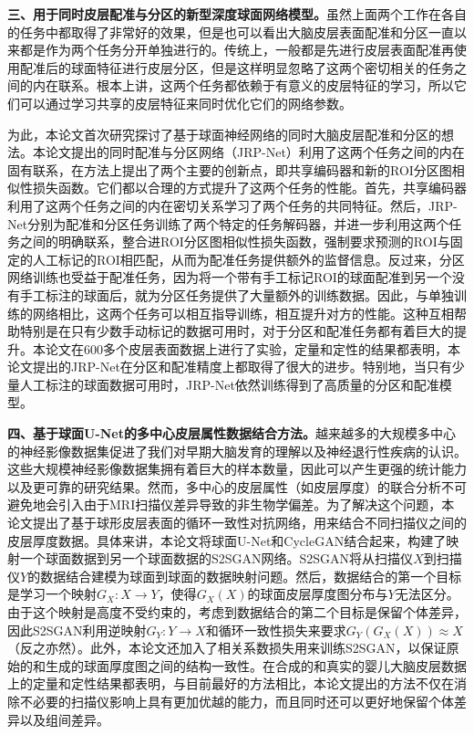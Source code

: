 \textbf{三、用于同时皮层配准与分区的新型深度球面网络模型。}虽然上面两个工作在各自的任务中都取得了非常好的效果，但是也可以看出大脑皮层表面配准和分区一直以来都是作为两个任务分开单独进行的。传统上，一般都是先进行皮层表面配准再使用配准后的球面特征进行皮层分区，但是这样明显忽略了这两个密切相关的任务之间的内在联系。根本上讲，这两个任务都依赖于有意义的皮层特征的学习，所以它们可以通过学习共享的皮层特征来同时优化它们的网络参数。

为此，本论文首次研究探讨了基于球面神经网络的同时大脑皮层配准和分区的想法。本论文提出的同时配准与分区网络（JRP-Net）利用了这两个任务之间的内在固有联系，在方法上提出了两个主要的创新点，即共享编码器和新的ROI分区图相似性损失函数。它们都以合理的方式提升了这两个任务的性能。首先，共享编码器利用了这两个任务之间的内在密切关系学习了两个任务的共同特征。然后，JRP-Net分别为配准和分区任务训练了两个特定的任务解码器，并进一步利用这两个任务之间的明确联系，整合进ROI分区图相似性损失函数，强制要求预测的ROI与固定的人工标记的ROI相匹配，从而为配准任务提供额外的监督信息。反过来，分区网络训练也受益于配准任务，因为将一个带有手工标记ROI的球面配准到另一个没有手工标注的球面后，就为分区任务提供了大量额外的训练数据。因此，与单独训练的网络相比，这两个任务可以相互指导训练，相互提升对方的性能。这种互相帮助特别是在只有少数手动标记的数据可用时，对于分区和配准任务都有着巨大的提升。本论文在600多个皮层表面数据上进行了实验，定量和定性的结果都表明，本论文提出的JRP-Net在分区和配准精度上都取得了很大的进步。特别地，当只有少量人工标注的球面数据可用时，JRP-Net依然训练得到了高质量的分区和配准模型。

\textbf{四、基于球面U-Net的多中心皮层属性数据结合方法。}越来越多的大规模多中心的神经影像数据集促进了我们对早期大脑发育的理解以及神经退行性疾病的认识。这些大规模神经影像数据集拥有着巨大的样本数量，因此可以产生更强的统计能力以及更可靠的研究结果。然而，多中心的皮层属性（如皮层厚度）的联合分析不可避免地会引入由于MRI扫描仪差异导致的非生物学偏差。为了解决这个问题，本论文提出了基于球形皮层表面的循环一致性对抗网络，用来结合不同扫描仪之间的皮层厚度数据。具体来讲，本论文将球面U-Net和CycleGAN结合起来，构建了映射一个球面数据到另一个球面数据的S2SGAN网络。S2SGAN将从扫描仪$X$到扫描仪$Y$的数据结合建模为球面到球面的数据映射问题。然后，数据结合的第一个目标是学习一个映射$G_X:X\rightarrow Y$，使得$G_X(X)$的球面皮层厚度图分布与$Y$无法区分。由于这个映射是高度不受约束的，考虑到数据结合的第二个目标是保留个体差异，因此S2SGAN利用逆映射$G_Y:Y\rightarrow X$和循环一致性损失来要求$G_Y(G_X(X))\approx X$（反之亦然）。此外，本论文还加入了相关系数损失用来训练S2SGAN，以保证原始的和生成的球面厚度图之间的结构一致性。在合成的和真实的婴儿大脑皮层数据上的定量和定性结果都表明，与目前最好的方法相比，本论文提出的方法不仅在消除不必要的扫描仪影响上具有更加优越的能力，而且同时还可以更好地保留个体差异以及组间差异。


